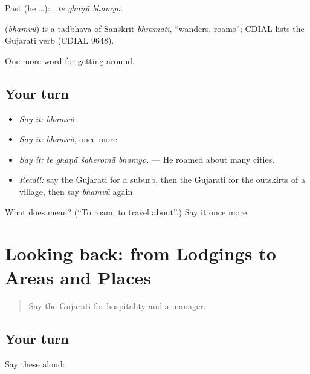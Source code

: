 Past (he …):   , \emph{te ghaṇũ bhamyo}.

\begin{cousinweb}
\textbf{} (\emph{bhamvũ}) is a tadbhava of Sanskrit \emph{bhramati}, \textquotedblleft{}wanders, roams\textquotedblright{}; CDIAL lists the Gujarati verb (CDIAL 9648).
\end{cousinweb}

\begin{grammarlens}[title={What you've built}]
One more word for getting around.
\end{grammarlens}

\subsection*{Your turn}
\begin{itemize}
\raggedright
  \item \emph{Say it:} \emph{bhamvũ}
  \item \emph{Say it:} \emph{bhamvũ}, once more
  \item \emph{Say it:} \emph{te ghaṇā̃ śaheromā̃ bhamyo.} — He roamed about many cities.
  \item \emph{Recall:} say the Gujarati for a suburb, then the Gujarati for the outskirts of a village, then say \emph{bhamvũ} again
\end{itemize}

\begin{tcolorbox}[breakable,colback=teal!4,colframe=teal!35!black,title={Before you move on}]
What does  mean? (\textquotedblleft{}To roam; to travel about\textquotedblright{}.) Say it once more.
\end{tcolorbox}
\section[(dialogue)]{Looking back: from Lodgings to Areas and Places}

\label{lesson:GU-R416-review-409-416}



\begin{quote}
Say the Gujarati for hospitality and a manager.
\end{quote}

\subsection*{Your turn}
Say these aloud:

